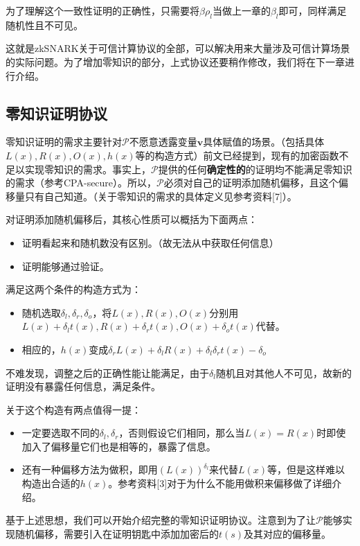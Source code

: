 \documentclass[12pt]{article}
\newcommand{\zk}{zkSNARK}
\newcommand{\pp}{$\mathcal{P}$}
\begin{document}
为了理解这个一致性证明的正确性，只需要将$\beta \rho_l$当做上一章的$\beta_l$即可，同样满足随机性且不可见。

这就是\zk 关于可信计算协议的全部，可以解决用来大量涉及可信计算场景的实际问题。为了增加零知识的部分，上式协议还要稍作修改，我们将在下一章进行介绍。
\subsection{零知识证明协议}
零知识证明的需求主要针对\pp 不愿意透露变量$\bm{v}$具体赋值的场景。（包括具体$L(x),R(x),O(x),h(x)$等的构造方式）前文已经提到，现有的加密函数不足以实现零知识的需求。事实上，\pp 提供的任何\textbf{确定性的}的证明均不能满足零知识的需求（参考CPA-secure）。所以，\pp 必须对自己的证明添加随机偏移，且这个偏移量只有自己知道。（关于零知识的需求的具体定义见参考资料[7]）。

对证明添加随机偏移后，其核心性质可以概括为下面两点：
\begin{itemize}
	\item 证明看起来和随机数没有区别。（故无法从中获取任何信息）
	\item 证明能够通过验证。
\end{itemize}
满足这两个条件的构造方式为：
\begin{itemize}
	\item 随机选取$\delta_l,\delta_r,\delta_o$，将$L(x),R(x),O(x)$分别用$L(x)+\delta_l t(x),R(x)+\delta_r t(x),O(x)+\delta_o t(x)$代替。
	\item 相应的，$h(x)$变成$\delta_r L(x)+\delta_l R(x)+\delta_l\delta_r t(x)-\delta_o$
\end{itemize}
不难发现，调整之后的正确性能让能满足，由于$\delta_l$随机且对其他人不可见，故新的证明没有暴露任何信息，满足条件。

关于这个构造有两点值得一提：
\begin{itemize}
	 \item 一定要选取不同的$\delta_l,\delta_r$，否则假设它们相同，那么当$L(x)=R(x)$时即使加入了偏移量它们也是相等的，暴露了信息。
	 \item 还有一种偏移方法为做积，即用$(L(x))^{\delta_l}$来代替$L(x)$等，但是这样难以构造出合适的$h(x)$。参考资料[3]对于为什么不能用做积来偏移做了详细介绍。
\end{itemize}
基于上述思想，我们可以开始介绍完整的零知识证明协议。注意到为了让\pp 能够实现随机偏移，需要引入在证明钥匙中添加加密后的$t(s)$及其对应的偏移量。
\end{document}
